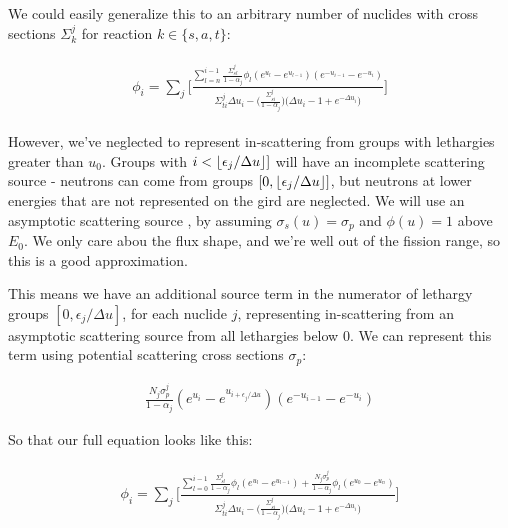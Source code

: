 \documentclass{article}
\DeclarePairedDelimiter\floor{\lfloor}{\rfloor}
\begin{document}
        We could easily generalize this to an arbitrary number of nuclides with cross sections $\Sigma_k^j$ for 
        reaction $k \in \{s,a,t\}$:
        
        \begin{align}
        \begin{split}
            \label{eq:soln}
            \phi_i =
                \sum_j \bigg[
            \frac{
                \sum_{l = n}^{i-1} \frac{ \Sigma_{sl}^j }{1-\alpha_j}  \phi_l  
                (e^{u_l} - e^{u_{l-1}})   (e^{-u_{i-1}} - e^{-u_{i}}) 
            }
            {  
               \Sigma_{ti}^j  \Delta u_i  - 
                \big( \frac{ \Sigma_{si}^j }{1-\alpha_j}  \big)
            \big( \Delta u_i -1 + e^{-\Delta u_i} \big) 
             }
         \bigg]
        \end{split}
        \end{align}
        
        
        However, we've neglected to represent in-scattering from groups with lethargies greater than 
        $u_0$. Groups with $i < \floor{\epsilon_j/\Delta u}]$ will have an incomplete scattering source - 
        neutrons can come from groups $[0 , \floor{\epsilon_j/\Delta u}]$, but neutrons at lower
        energies that are not represented on the gird are neglected. 
        We will use an asymptotic scattering source , by assuming $\sigma_s(u) = \sigma_p$ and 
        $\phi(u) = 1$ above $E_0$. 
        We only care abou the flux shape, and we're well out of the fission range, so this is a good approximation.
        
        This means we have an additional source term in the numerator of 
        lethargy groups $[0,\epsilon_j/\Delta u]$, for each nuclide $j$,
        representing in-scattering from an asymptotic scattering source from
        all lethargies below 0.
        We can represent this term using potential scattering cross sections $\sigma_p$:
        
        \begin{align}
            \frac{ N_j \sigma_{p}^j }{1-\alpha_j}
                (e^{u_i} - e^{u_{i+\epsilon_j/\Delta u}})  (e^{-u_{i-1}} - e^{-u_{i}}) 
        \end{align}

        So that our full equation looks like this:
        
        \begin{align}
        \begin{split}
            \label{eq:soln}
            \phi_i = 
            \sum_j \bigg[
            \frac{
                \sum_{l = 0}^{i-1} \frac{ \Sigma_{sl}^j }{1-\alpha_j}  \phi_l  
                (e^{u_l} - e^{u_{l-1}})  
                +
                 \frac{N_j  \sigma_{p}^j }{1-\alpha_j}  \phi_l  
                 (e^{u_0} - e^{u_n})   
            }
            {  
                \Sigma_{ti}^j  \Delta u_i  - 
                \big( \frac{ \Sigma_{si}^j }{1-\alpha_j}  \big)
            \big( \Delta u_i -1 + e^{-\Delta u_i} \big)  
             }
         \bigg]
        \end{split}
        \end{align}
\end{document}
